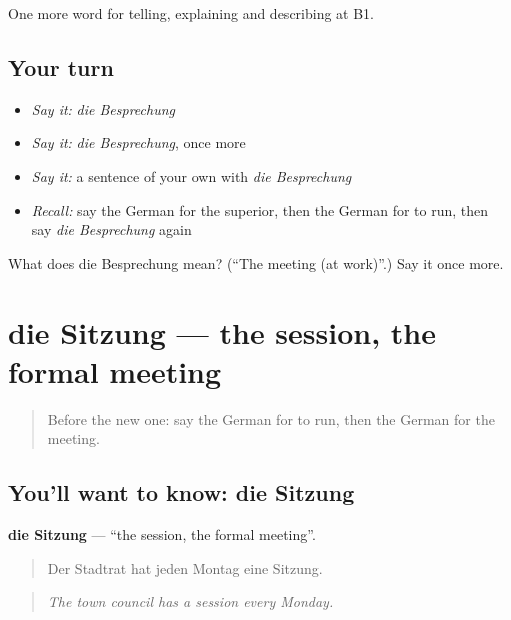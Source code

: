 \begin{grammarlens}[title={What you've built}]
One more word for telling, explaining and describing at B1.
\end{grammarlens}

\subsection*{Your turn}
\begin{itemize}
\raggedright
  \item \emph{Say it:} \emph{die Besprechung}
  \item \emph{Say it:} \emph{die Besprechung}, once more
  \item \emph{Say it:} a sentence of your own with \emph{die Besprechung}
  \item \emph{Recall:} say the German for the superior, then the German for to run, then say \emph{die Besprechung} again
\end{itemize}

\begin{tcolorbox}[breakable,colback=teal!4,colframe=teal!35!black,title={Before you move on}]
What does die Besprechung mean? (\textquotedblleft{}The meeting (at work)\textquotedblright{}.) Say it once more.
\end{tcolorbox}
\section[die Sitzung]{die Sitzung — the session, the formal meeting}

\label{lesson:GE-C354-sitzung}



\begin{quote}
Before the new one: say the German for to run, then the German for the meeting.
\end{quote}

\subsection*{You'll want to know: die Sitzung}
\textbf{die Sitzung} — \textquotedblleft{}the session, the formal meeting\textquotedblright{}.

\begin{quote}
Der Stadtrat hat jeden Montag eine Sitzung.
\end{quote}

\begin{quote}
\emph{The town council has a session every Monday.}
\end{quote}

